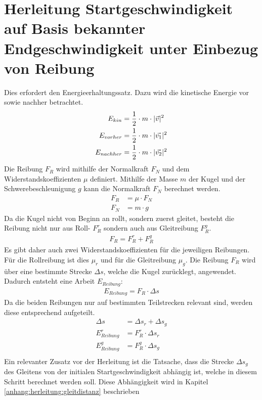\section{Herleitung Startgeschwindigkeit auf Basis bekannter Endgeschwindigkeit unter Einbezug von Reibung}\label{anhang:herleitung:StartgeschwAnhandEndgeschwMitReibung}
Dies erfordert den Energieerhaltungssatz. Dazu wird die kinetische Energie vor sowie nachher betrachtet.
\begin{align}
    E_{kin} &= \frac{1}{2} \cdot m \cdot \lvert \vec{v} \rvert^2\\
    E_{vorher} &= \frac{1}{2} \cdot m \cdot \lvert \vec{v_1} \rvert^2\\
    E_{nachher} &= \frac{1}{2} \cdot m \cdot \lvert \vec{v_2} \rvert^2
\end{align}
Die Reibung $F_R$ wird mithilfe der Normalkraft $F_N$ und dem Widerstandskoeffizienten $\mu$ definiert\cite{wiki.rollreibung:1}.
Mithilfe der Masse $m$ der Kugel und der Schwerebeschleunigung $g$ kann die Normalkraft $F_N$ berechnet werden.
\begin{align}
    F_R &= \mu \cdot F_N\\
    F_N &= m \cdot g
\end{align}
Da die Kugel nicht von Beginn an rollt, sondern zuerst gleitet, besteht die Reibung nicht nur aus Roll- $F^r_R$ sondern auch aus
Gleitreibung $F^g_R$.
\begin{align}
    F_R = F^r_R + F^g_R
\end{align}
Es gibt daher auch zwei Widerstandskoeffizienten für die jeweiligen Reibungen. Für die Rollreibung ist dies $\mu_r$ und
für die Gleitreibung $\mu_g$.
Die Reibung $F_R$ wird über eine bestimmte Strecke $\Delta s$, welche die Kugel zurücklegt, angewendet.
Dadurch entsteht eine Arbeit $E_{Reibung}$\cite{wiki.arbeit_physik:1}:
\begin{align}
    E_{Reibung} = F_R \cdot \Delta s
\end{align}
Da die beiden Reibungen nur auf bestimmten Teilstrecken relevant sind, werden diese entsprechend aufgeteilt.
\begin{align}
    \Delta s &= \Delta s_r + \Delta s_g\\
    E^r_{Reibung} &= F^r_R \cdot \Delta s_r\\
    E^g_{Reibung} &= F^g_R \cdot \Delta s_g\\
\end{align}
Ein relevanter Zusatz vor der Herleitung ist die Tatsache, dass die Strecke $\Delta s_g$ des Gleitens von der initialen
Startgeschwindigkeit abhängig ist, welche in diesem Schritt berechnet werden soll. Diese Abhängigkeit wird in Kapitel \ref{anhang:herleitung:gleitdistanz} beschrieben
